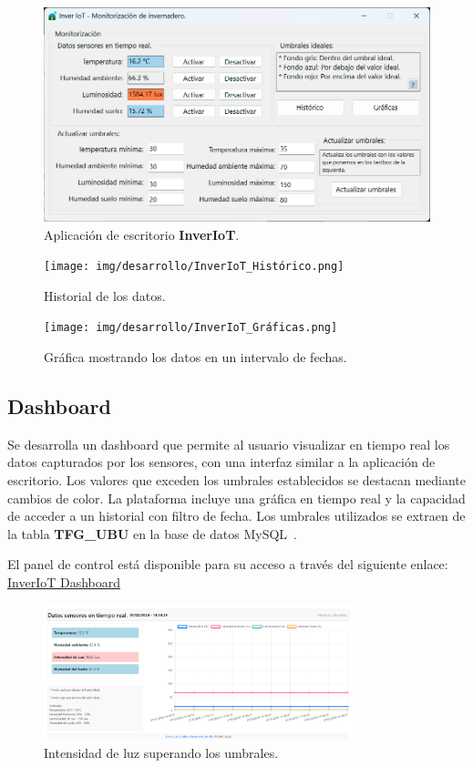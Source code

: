 \begin{figure}[h]
    \centering
    \includegraphics[width=1\textwidth]{img/desarrollo/InverIoT_Desktop.png}
	\caption{Aplicación de escritorio \textbf{InverIoT}.}
\end{figure}
\pagebreak

\begin{figure}[h]
    \centering
    \texttt{[image: img/desarrollo/InverIoT\_Histórico.png]}
    \caption{Historial de los datos.}
\end{figure}


\begin{figure}[h]
    \centering
    \texttt{[image: img/desarrollo/InverIoT\_Gráficas.png]}
    \caption{Gráfica mostrando los datos en un intervalo de fechas.}
\end{figure}
\pagebreak

\subsection{Dashboard}\label{proyecto:Dashboard}
Se desarrolla un dashboard que permite al usuario visualizar en tiempo real los datos capturados por los sensores, con una interfaz similar a la aplicación de escritorio. Los valores que exceden los umbrales establecidos se destacan mediante cambios de color. La plataforma incluye una gráfica en tiempo real y la capacidad de acceder a un historial con filtro de fecha. Los umbrales utilizados se extraen de la tabla \textbf{TFG\_UBU} en la base de datos MySQL~\cite{misc:Mysql}.

El panel de control está disponible para su acceso a través del siguiente enlace: \href{http://www.inveriot.com}{InverIoT Dashboard}

\begin{figure}[h]
    \centering
    \includegraphics[width=0.8\textwidth]{img/desarrollo/Dashboard1.png}
    \caption{Intensidad de luz superando los umbrales.} \label{Img:Dashboard1}
\end{figure}

